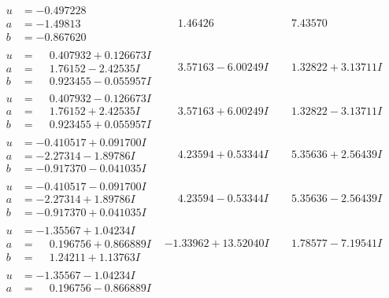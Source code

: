 \documentclass[1p]{elsarticle_modified}
\theoremstyle{definition}
\begin{document}
$$\begin{array}{c|c|c}
\begin{aligned}
u &= -0.497228\phantom{ +0.000000I} \\
a &= -1.49813\phantom{ +0.000000I} \\
b &= -0.867620\phantom{ +0.000000I}\end{aligned}
 & \phantom{-}1.46426\phantom{ +0.000000I} & \phantom{-}7.43570\phantom{ +0.000000I} \\ \hline\begin{aligned}
u &= \phantom{-}0.407932 + 0.126673 I \\
a &= \phantom{-}1.76152 - 2.42535 I \\
b &= \phantom{-}0.923455 - 0.055957 I\end{aligned}
 & \phantom{-}3.57163 - 6.00249 I & \phantom{-}1.32822 + 3.13711 I \\ \hline\begin{aligned}
u &= \phantom{-}0.407932 - 0.126673 I \\
a &= \phantom{-}1.76152 + 2.42535 I \\
b &= \phantom{-}0.923455 + 0.055957 I\end{aligned}
 & \phantom{-}3.57163 + 6.00249 I & \phantom{-}1.32822 - 3.13711 I \\ \hline\begin{aligned}
u &= -0.410517 + 0.091700 I \\
a &= -2.27314 - 1.89786 I \\
b &= -0.917370 - 0.041035 I\end{aligned}
 & \phantom{-}4.23594 + 0.53344 I & \phantom{-}5.35636 + 2.56439 I \\ \hline\begin{aligned}
u &= -0.410517 - 0.091700 I \\
a &= -2.27314 + 1.89786 I \\
b &= -0.917370 + 0.041035 I\end{aligned}
 & \phantom{-}4.23594 - 0.53344 I & \phantom{-}5.35636 - 2.56439 I \\ \hline\begin{aligned}
u &= -1.35567 + 1.04234 I \\
a &= \phantom{-}0.196756 + 0.866889 I \\
b &= \phantom{-}1.24211 + 1.13763 I\end{aligned}
 & -1.33962 + 13.52040 I & \phantom{-}1.78577 - 7.19541 I \\ \hline\begin{aligned}
u &= -1.35567 - 1.04234 I \\
a &= \phantom{-}0.196756 - 0.866889 I \\

\end{aligned}
\end{array}$$
\end{document}
